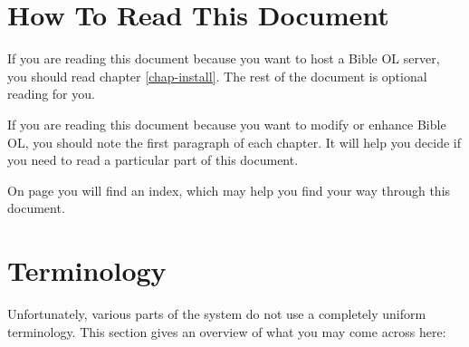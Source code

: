 \documentclass[11pt,oneside,a4paper]{memoir}
\begin{document}
\section{How To Read This Document}

If you are reading this document because you want to host a Bible OL server, you should read chapter
\ref{chap-install}. The rest of the document is optional reading for you.

If you are reading this document because you want to modify or enhance Bible OL, you should note
the first paragraph of each chapter. It will help you decide if you need to read a
particular part of this document.

On page \pageref{sec-index} you will find an index, which may help you find your way through this document.


\section{Terminology}\label{sec-terminology}

Unfortunately, various parts of the system do not use a completely uniform terminology. This section
gives an overview of what you may come across here:
\end{document}
